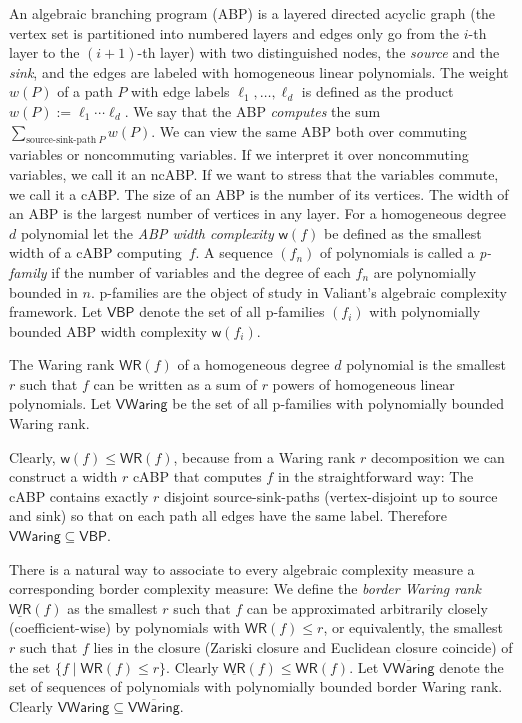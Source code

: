 \documentclass[10pt,a4paper]{article}
\numberwithin{equation}{section}
\theoremstyle{definition}
\newcommand{\VBP}{\ensuremath{\mathsf{VBP}}}
\newcommand{\VWaring}{\ensuremath{\mathsf{VWaring}}}
\newcommand{\WR}{{\mathsf{WR}}}
\newcommand{\wW}{{\mathsf{w}}}
\begin{document}
An algebraic branching program (ABP) is a layered directed acyclic graph (the vertex set is partitioned into numbered layers and edges only go from the $i$-th layer to the $(i+1)$-th layer) with two distinguished nodes, the \emph{source} and the \emph{sink}, and the edges are labeled with homogeneous linear polynomials.
The weight $w(P)$ of a path $P$ with edge labels $\ell_1, \ldots, \ell_d$ is defined as the product $w(P) := \ell_1 \cdots \ell_d.$
We say that the ABP \emph{computes} the sum $\sum_{\text{source-sink-path}\ P} w(P)$.
We can view the same ABP both over commuting variables or noncommuting variables.
If we interpret it over noncommuting variables, we call it an ncABP. If we want to stress that the variables commute, we call it a cABP.
The size of an ABP is the number of its vertices. The width of an ABP is the largest number of vertices in any layer.
For a homogeneous degree $d$ polynomial let the \emph{ABP width complexity} $\wW(f)$ be defined as the smallest width of a cABP computing~$f$. 
A sequence $(f_n)$ of polynomials is called a \emph{p-family} if the number of variables
and the degree of each $f_n$ are polynomially bounded in $n$. p-families are the object of study
in Valiant's algebraic complexity framework.
Let $\VBP$ denote the set of all p-families $(f_i)$ with polynomially bounded ABP width complexity $\wW(f_i)$.

The Waring rank $\WR(f)$ of a homogeneous degree $d$ polynomial is the smallest $r$ such that $f$ can be written as a sum of $r$ powers of homogeneous linear polynomials.
Let $\VWaring$ be the set of all p-families with polynomially bounded Waring rank.

Clearly, $\wW(f) \leq \WR(f)$, because from a Waring rank $r$ decomposition we can construct a width $r$ cABP that computes $f$ in the straightforward way: The cABP contains exactly $r$ disjoint source-sink-paths (vertex-disjoint up to source and sink) so that on each path all edges have the same label. Therefore $\VWaring \subseteq \VBP$.

There is a natural way to associate to every algebraic complexity measure a corresponding border complexity measure:
We define the \emph{border Waring rank} $\underline{\WR}(f)$ as the smallest $r$ such that $f$ can be approximated arbitrarily closely (coefficient-wise) by polynomials with $\WR(f)\leq r$, or equivalently, the smallest $r$ such that $f$ lies in the closure (Zariski closure and Euclidean closure coincide) of the set $\{f \mid \WR(f) \leq r\}$.
Clearly $\underline{\WR}(f)\leq \WR(f)$.
Let $\overline{\VWaring}$ denote the set of sequences of polynomials with polynomially bounded border Waring rank. Clearly $\VWaring \subseteq \overline{\VWaring}$.
\end{document}

